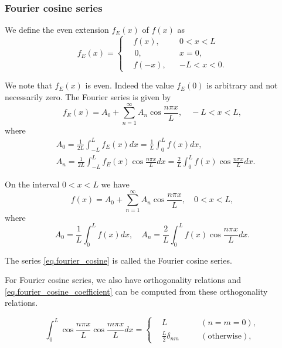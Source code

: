 \subsubsection{Fourier cosine series}


We define the even extension $f_E(x)$ of $f(x)$ as
\begin{equation}\label{eq.even_extension}
    f_E(x)=\left\{\begin{aligned}
        &f(x), && 0<x<L 
        \\
        &\,0, && x=0, 
        \\
        &f(-x), && -L<x<0 .
        \end{aligned}\right.
\end{equation}

We note that $f_E(x)$ is even. Indeed the value $f_E(0)$ is arbitrary and not necessarily zero. The Fourier series is given by
$$
f_E(x)=A_0+\sum_{n=1}^{\infty} A_n \cos \frac{n \pi x}{L}, \quad-L<x<L,
$$
where
$$
\begin{aligned}
& A_0=\frac{1}{2 L} \int_{-L}^L f_E(x) d x=\frac{1}{L} \int_0^L f(x) d x, \\
& A_n=\frac{1}{2 L} \int_{-L}^L f_E(x) \cos \frac{n \pi x}{L} d x=\frac{2}{L} \int_0^L f(x) \cos \frac{n \pi x}{L} d x .
\end{aligned}
$$

On the interval $0<x<L$ we have
\begin{equation}\label{eq.fourier_cosine}
    f(x)=A_0+\sum_{n=1}^{\infty} A_n \cos \frac{n \pi x}{L}, \quad 0<x<L,
\end{equation}
where
\begin{equation}\label{eq.fourier_cosine_coefficient}
    A_0=\frac{1}{L} \int_0^L f(x) d x, \quad A_n=\frac{2}{L} \int_0^L f(x) \cos \frac{n \pi x}{L} d x .
\end{equation}


\begin{definition}[]
    The series \eqref{eq.fourier_cosine} is called the Fourier cosine series.
\end{definition}

For Fourier cosine series, we also have orthogonality relations and \eqref{eq.fourier_cosine_coefficient} can be computed from these orthogonality relations.

\begin{theorem}
    \begin{equation}\label{eq.cosine_orthogonality}
        \int_{0}^L \cos \frac{n \pi x}{L} \cos \frac{m \pi x}{L} d x=\left\{
                \begin{aligned}
                &L \quad && (n=m=0), 
                \\
                &\frac{L}{2} \delta_{n m} \quad && (\text{otherwise}),
                \end{aligned}\right.
    \end{equation}
\end{theorem}

